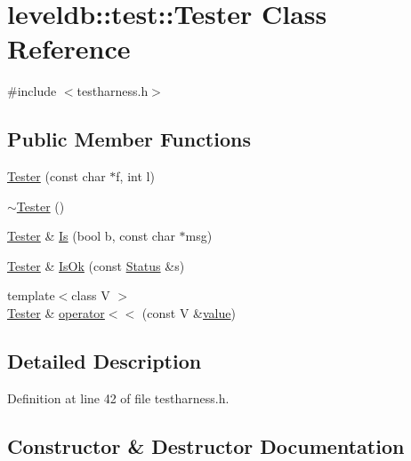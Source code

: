 \hypertarget{classleveldb_1_1test_1_1_tester}{}\section{leveldb\+:\+:test\+:\+:Tester Class Reference}
\label{classleveldb_1_1test_1_1_tester}


{\ttfamily \#include $<$testharness.\+h$>$}

\subsection*{Public Member Functions}
\begin{DoxyCompactItemize}
\item 
\hyperlink{classleveldb_1_1test_1_1_tester_a166bc7b18483780292a44425ef5e64f7}{Tester} (const char $\ast$f, int l)
\item 
\hyperlink{classleveldb_1_1test_1_1_tester_a832d52d6aa29945cccdf762b54481295}{$\sim$\+Tester} ()
\item 
\hyperlink{classleveldb_1_1test_1_1_tester}{Tester} \& \hyperlink{classleveldb_1_1test_1_1_tester_ad75cd5ea132083b72e7fd7271ef1918a}{Is} (bool b, const char $\ast$msg)
\item 
\hyperlink{classleveldb_1_1test_1_1_tester}{Tester} \& \hyperlink{classleveldb_1_1test_1_1_tester_af0e4decc6f483a78af44926634d990c2}{Is\+Ok} (const \hyperlink{classleveldb_1_1_status}{Status} \&s)
\item 
{\footnotesize template$<$class V $>$ }\\\hyperlink{classleveldb_1_1test_1_1_tester}{Tester} \& \hyperlink{classleveldb_1_1test_1_1_tester_a4e776d487df19ac9daeed5527cd1d80e}{operator$<$$<$} (const V \&\hyperlink{cache_8cc_a0f61d63b009d0880a89c843bd50d8d76}{value})
\end{DoxyCompactItemize}


\subsection{Detailed Description}


Definition at line 42 of file testharness.\+h.



\subsection{Constructor \& Destructor Documentation}
\hypertarget{classleveldb_1_1test_1_1_tester_a166bc7b18483780292a44425ef5e64f7}{}
